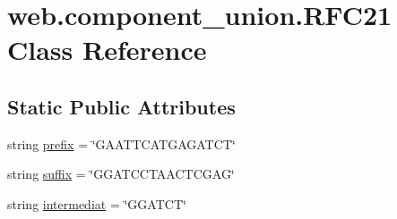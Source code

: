 \hypertarget{classweb_1_1component__union_1_1_r_f_c21}{\section{web.\-component\-\_\-union.\-R\-F\-C21 Class Reference}
\label{classweb_1_1component__union_1_1_r_f_c21}
}
\subsection*{Static Public Attributes}
\begin{DoxyCompactItemize}
\item 
string \hyperlink{classweb_1_1component__union_1_1_r_f_c21_ad8cf78991352d8d2df4462d4911b0f08}{prefix} = \char`\"{}G\-A\-A\-T\-T\-C\-A\-T\-G\-A\-G\-A\-T\-C\-T\char`\"{}
\item 
string \hyperlink{classweb_1_1component__union_1_1_r_f_c21_a17f59e8a9402a61bbe4e1943c74068fc}{suffix} = \char`\"{}G\-G\-A\-T\-C\-C\-T\-A\-A\-C\-T\-C\-G\-A\-G\char`\"{}
\item 
string \hyperlink{classweb_1_1component__union_1_1_r_f_c21_a64e75fe85791a49cae4b9daec3e0b61c}{intermediat} = \char`\"{}G\-G\-A\-T\-C\-T\char`\"{}
\end{DoxyCompactItemize}


